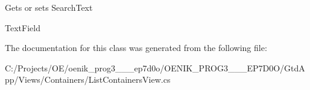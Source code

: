 Gets or sets Search\+Text 

Text\+Field

The documentation for this class was generated from the following file\+:\begin{DoxyCompactItemize}
\item 
C\+:/\+Projects/\+O\+E/oenik\+\_\+prog3\+\_\+\_\+\_\+ep7d0o/\+O\+E\+N\+I\+K\+\_\+\+P\+R\+O\+G3\+\_\+\_\+\_\+\+E\+P7\+D0\+O/\+Gtd\+App/\+Views/\+Containers/List\+Containers\+View.\+cs\end{DoxyCompactItemize}
